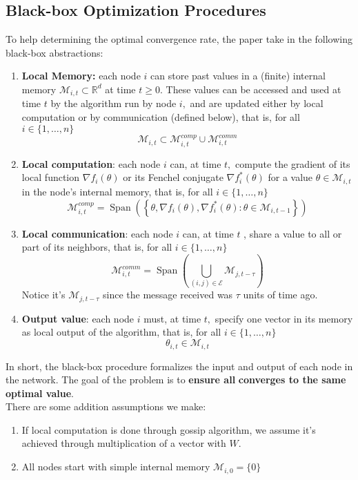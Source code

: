 \documentclass[12pt]{article}
\begin{document}
\subsection{Black-box Optimization Procedures}
To help determining the optimal convergence rate, the paper take in the following black-box abstractions:
\begin{enumerate}
    \item \textbf{Local Memory: } each node $i$ can store past values in a (finite) internal memory $\mathcal { M } _ { i , t } \subset \mathbb { R } ^ { d }$ at
time $t \geq 0 .$ These values can be accessed and used at time $t$ by the algorithm run by node $i ,$
and are updated either by local computation or by communication (defined below), that is, for
all $i \in \{ 1 , \ldots , n \}$ $$
\mathcal { M } _ { i , t } \subset \mathcal { M } _ { i , t } ^ { c o m p } \cup \mathcal { M } _ { i , t } ^ { c o m m }
$$
    \item \textbf{Local computation}: each node $i$ can, at time $t ,$ compute the gradient of its local function
$\nabla f _ { i } ( \theta )$ or its Fenchel conjugate $\nabla f _ { i } ^ { * } ( \theta )$ for a value $\theta \in \mathcal { M } _ { i , t }$ in the node's internal memory,
that is, for all $i \in \{ 1 , \ldots , n \}$
$$\mathcal { M } _ { i , t } ^ { c o m p } = \operatorname { Span } \left( \left\{ \theta , \nabla f _ { i } ( \theta ) , \nabla f _ { i } ^ { * } ( \theta ) : \theta \in \mathcal { M } _ { i , t - 1 } \right\} \right)$$
    \item \textbf{Local communication}: each node $i$ can, at time $t$ , share a value to all or part of its neighbors,
that is, for all $i \in \{ 1 , \ldots , n \}$ $$
\mathcal { M } _ { i , t } ^ { c o m m } = \operatorname { Span } \left( \bigcup _ { ( i , j ) \in \mathcal { E } } \mathcal { M } _ { j , t - \tau } \right)
$$ Notice it's $\mathcal{M}_{j, t - \tau}$ since the message received was $\tau$ units of time ago.
    \item \textbf{Output value}: each node $i$ must, at time $t ,$ specify one vector in its memory as local output
of the algorithm, that is, for all $i \in \{ 1 , \ldots , n \}$ $$
\theta _ { i , t } \in \mathcal { M } _ { i , t }
$$
\end{enumerate}
In short, the black-box procedure formalizes the input and output of each node in the network. The goal of the problem is to  \textbf{ensure all}  \textbf{converges to the same optimal value}.\\
\newline
There are some addition assumptions we make:
\begin{enumerate}
    \item If local computation is done through gossip algorithm, we assume it's achieved through multiplication of a vector with $W$.
    \item All nodes start with simple internal memory $\mathcal { M } _ { i , 0 } = \{ 0 \}$
\end{enumerate}
\end{document}
